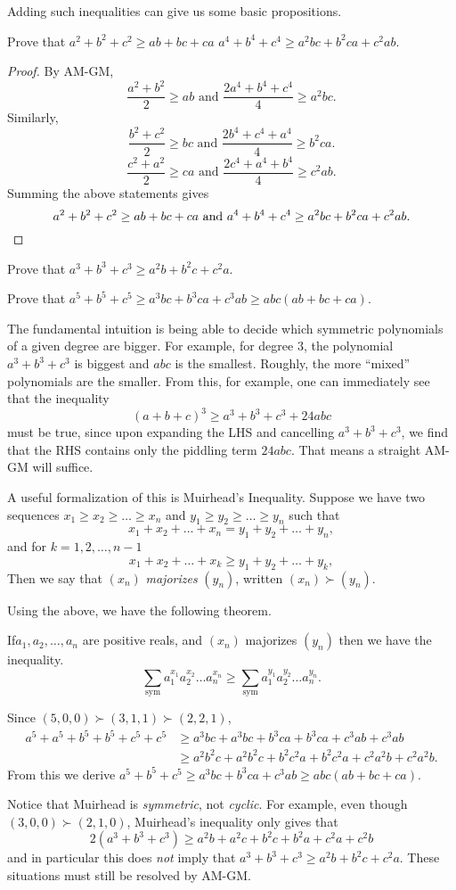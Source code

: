 \documentclass[11pt]{scrartcl}
\begin{document}
Adding such inequalities can give us some basic propositions.
\begin{example}
	Prove that $a^2+b^2+c^2 \ge ab+bc+ca$ $a^4+b^4+c^4 \ge a^2bc+b^2ca+c^2ab$.
\end{example}
\begin{proof}
	By AM-GM,
	\[ \frac{a^2+b^2}{2} \ge ab \text{ and } \frac{2a^4+b^4+c^4}{4} \ge a^2bc. \]
	Similarly,
	\[ \frac{b^2+c^2}{2} \ge bc \text{ and } \frac{2b^4+c^4+a^4}{4} \ge b^2ca. \]
	\[ \frac{c^2+a^2}{2} \ge ca \text{ and } \frac{2c^4+a^4+b^4}{4} \ge c^2ab. \]
	Summing the above statements gives
	\[ a^2+b^2+c^2 \ge ab+bc+ca \text{ and } a^4+b^4+c^4 \ge a^2bc+b^2ca+c^2ab. \qedhere \]
\end{proof}
\begin{exercise}
	Prove that $a^3+b^3+c^3 \ge a^2b+b^2c+c^2a$.
\end{exercise}
\begin{exercise}
	Prove that $a^5+b^5+c^5 \ge a^3bc + b^3ca + c^3ab \ge abc(ab+bc+ca)$.
\end{exercise}
The fundamental intuition is being able to decide which symmetric polynomials of a given degree are bigger.
For example, for degree $3$, the polynomial $a^3+b^3+c^3$ is biggest and $abc$ is the smallest.
Roughly, the more ``mixed'' polynomials are the smaller.
From this, for example, one can immediately see that the inequality
\[ (a+b+c)^3 \ge a^3+b^3+c^3+24abc \]
must be true, since upon expanding the LHS and cancelling $a^3+b^3+c^3$,
we find that the RHS contains only the piddling term $24abc$.
That means a straight AM-GM will suffice.

A useful formalization of this is Muirhead's Inequality.
Suppose we have two sequences $x_1 \ge x_2 \ge \dots \ge x_n$ and $y_1 \ge y_2 \ge \dots \ge y_n$ such that
\[ x_1 + x_2 + \dots + x_n = y_1 + y_2 + \dots + y_n, \]
and for $k=1,2,\dots,n-1$
\[ x_1 + x_2 + \dots + x_k \ge y_1 + y_2 + \dots + y_k, \]
Then we say that $(x_n)$ \emph{majorizes} $(y_n)$, written $(x_n) \succ (y_n)$.

Using the above, we have the following theorem.
\begin{theorem}
	 If$a_1, a_2, \dots, a_n$ are positive reals, and $(x_n)$ majorizes $(y_n)$ then we have the inequality.
	\[ \sum_{\text{sym}} a_1^{x_1} a_2^{x_2} \dots a_n^{x_n}
		\ge \sum_{\text{sym}} a_1^{y_1} a_2^{y_2} \dots a_n^{y_n}. \]
\end{theorem}
\begin{example}
	Since $(5,0,0) \succ (3,1,1) \succ (2,2,1)$,
	\begin{align*}
		a^5+a^5+b^5+b^5+c^5+c^5 &\ge a^3bc+a^3bc+b^3ca+b^3ca+c^3ab+c^3ab \\
		&\ge a^2b^2c+a^2b^2c + b^2c^2a+b^2c^2a + c^2a^2b + c^2a^2b.
	\end{align*}
	From this we derive $a^5+b^5+c^5 \ge a^3bc+b^3ca+c^3ab \ge abc(ab+bc+ca)$.
\end{example}
Notice that Muirhead is \emph{symmetric}, not \emph{cyclic}.
For example, even though $(3,0,0) \succ (2,1,0)$, Muirhead's inequality only gives that
\[ 2(a^3+b^3+c^3) \ge a^2b+a^2c+b^2c+b^2a+c^2a+c^2b \]
and in particular this does \emph{not} imply that $a^3+b^3+c^3 \ge a^2b+b^2c+c^2a$. These situations must still be resolved by AM-GM.
\end{document}
